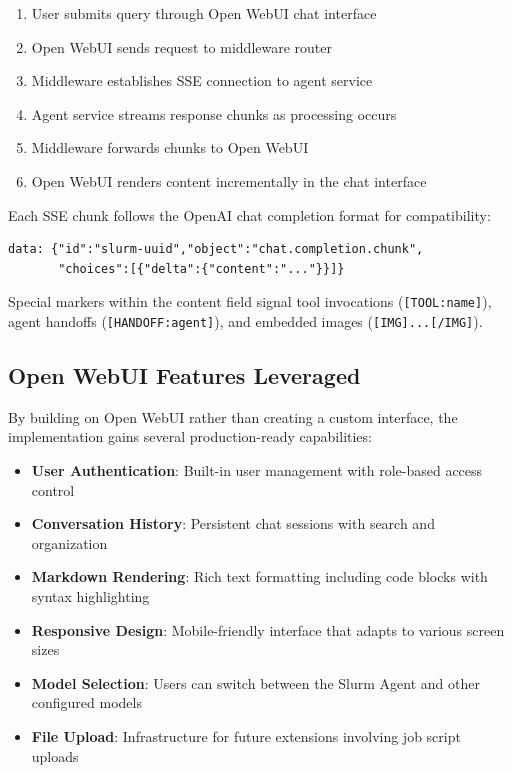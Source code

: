\begin{enumerate}
    \item User submits query through Open WebUI chat interface
    \item Open WebUI sends request to middleware router
    \item Middleware establishes SSE connection to agent service
    \item Agent service streams response chunks as processing occurs
    \item Middleware forwards chunks to Open WebUI
    \item Open WebUI renders content incrementally in the chat interface
\end{enumerate}

Each SSE chunk follows the OpenAI chat completion format for compatibility:

\begin{verbatim}
data: {"id":"slurm-uuid","object":"chat.completion.chunk",
       "choices":[{"delta":{"content":"..."}}]}
\end{verbatim}

Special markers within the content field signal tool invocations (\texttt{[TOOL:name]}), agent handoffs (\texttt{[HANDOFF:agent]}), and embedded images (\texttt{[IMG]...[/IMG]}).

\subsection{Open WebUI Features Leveraged}

By building on Open WebUI rather than creating a custom interface, the implementation gains several production-ready capabilities:

\begin{itemize}
    \item \textbf{User Authentication}: Built-in user management with role-based access control
    \item \textbf{Conversation History}: Persistent chat sessions with search and organization
    \item \textbf{Markdown Rendering}: Rich text formatting including code blocks with syntax highlighting
    \item \textbf{Responsive Design}: Mobile-friendly interface that adapts to various screen sizes
    \item \textbf{Model Selection}: Users can switch between the Slurm Agent and other configured models
    \item \textbf{File Upload}: Infrastructure for future extensions involving job script uploads
\end{itemize}


